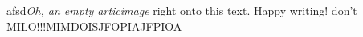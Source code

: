 afsd\textit{Oh, an empty articimage} right onto this text. Happy writing! 
don't MILO!!!MIMDOISJFOPIAJFPIOA